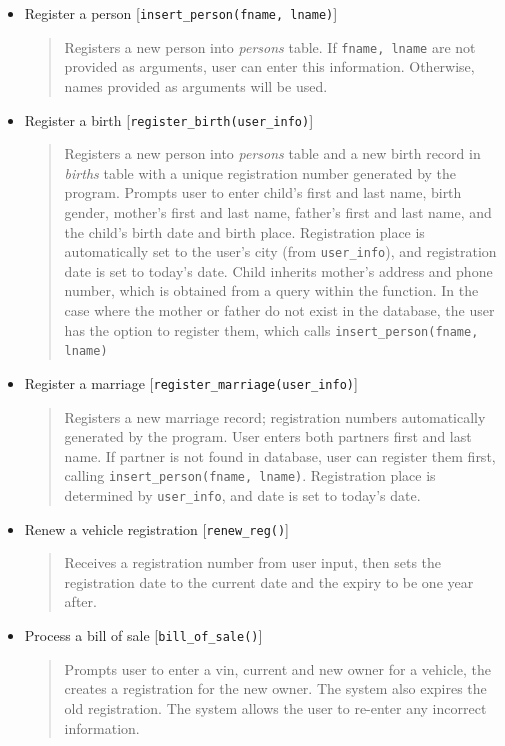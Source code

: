 \documentclass[10pt, a4paper]{article}
\begin{document}
{\begin{itemize}
\item Register a person [\texttt{insert\_person(fname, lname)}]
	\begin{quotation}
	\noindent Registers a new person into \emph{persons} table. If \texttt{fname, lname} are not provided as arguments, user can enter this information. Otherwise, names provided as arguments will be used. 
	\end{quotation}
	
\item Register a birth [\texttt{register\_birth(user\_info)}]
	\begin{quotation}
	\noindent Registers a new person into \emph{persons} table and a new birth record in \emph{births} table with a unique registration number generated by the program. Prompts user to enter child's first and last name, birth gender, mother's first and last name, father's first and last name, and the child's birth date and birth place. Registration place is automatically set to the user's city (from \texttt{user\_info}), and registration date is set to today's date. Child inherits mother's address and phone number, which is obtained from a query within the function. In the case where the mother or father do not exist in the database, the user has the option to register them, which calls \texttt{insert\_person(fname, lname)}
	\end{quotation}
	
\item Register a marriage [\texttt{register\_marriage(user\_info)}]
	\begin{quotation}
	\noindent Registers a new marriage record; registration numbers automatically generated by the program. User enters both partners first and last name. If partner is not found in database, user can register them first, calling \texttt{insert\_person(fname, lname)}. Registration place is determined by \texttt{user\_info}, and date is set to today's date. 
	\end{quotation}
	
\item Renew a vehicle registration [\texttt{renew\_reg()}]
	\begin{quotation}
	\noindent Receives a registration number from user input, then sets the registration date to the current date and the expiry to be one year after.
	\end{quotation}

\item Process a bill of sale [\texttt{bill\_of\_sale()}]
	\begin{quotation}
	\noindent Prompts user to enter a vin, current and new owner for a vehicle, the creates a registration for the new owner. The system also expires the old registration. The system allows the user to re-enter any incorrect information.
	\end{quotation}


\end{itemize}}
\end{document}
